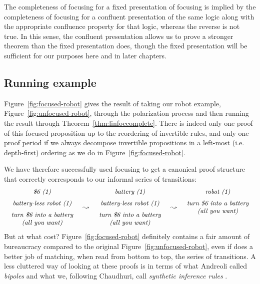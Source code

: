 The completeness of focusing for a fixed presentation of focusing is
implied by the completeness of focusing for a confluent presentation
of the same logic along with the appropriate confluence property for
that logic, whereas the reverse is not true. In this sense, the
confluent presentation allows us to prove a stronger theorem than the
fixed presentation does, though the fixed presentation will be
sufficient for our purposes here and in later chapters.

\subsection{Running example}



Figure~\ref{fig:focused-robot} gives the result of taking our robot
example, Figure~\ref{fig:unfocused-robot}, through the polarization
process and then running the result through
Theorem~\ref{thm:linfoccomplete}. There is indeed only one proof of
this focused proposition up to the reordering of invertible rules, and
only one proof period if we always decompose invertible propositions
in a left-most (i.e. depth-first) ordering as we do in
Figure~\ref{fig:focused-robot}.

We have therefore successfully used focusing to get a canonical
proof structure that correctly corresponds to our 
informal series of transitions:
\[
\begin{array}{ccccc}
\begin{array}{c}
\mbox{\it \$6 (1)}\medskip\\ 
\mbox{\it battery-less robot (1)} \medskip\\ 
\mbox{\it turn \$6 into a battery}\\
\mbox{\it (all you want)}
\end{array}
& \leadsto &
\begin{array}{c}
\mbox{\it battery  (1)}\medskip\\ 
\mbox{\it battery-less robot (1)} \medskip\\ 
\mbox{\it turn \$6 into a battery}\\
\mbox{\it (all you want)}
\end{array}
& \leadsto &
\begin{array}{c}
\mbox{\it robot (1)} \medskip\\ 
\mbox{\it turn \$6 into a battery}\\
\mbox{\it (all you want)}\medskip\\~\\
\end{array}
\end{array}
\]
But at what cost? Figure~\ref{fig:focused-robot} definitely contains a
fair amount of bureaucracy compared to the original
Figure~\ref{fig:unfocused-robot}, even if does a better job of
matching, when read from bottom to top, the series of transitions. A
less cluttered way of looking at these proofs is in terms of what
Andreoli called {\it bipoles} \cite{andreoli01focussing} and what we,
following Chaudhuri, call {\it synthetic inference rules}
\cite{chaudhuri08focusing}.

